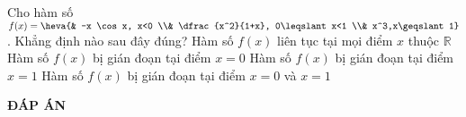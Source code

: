 \begin{ex}%
	Cho hàm số  $f(x)=\heva{& -x \cos x, x<0 \\& \dfrac{x^2}{1+x}, 0\leqslant x<1 \\& x^3,x\geqslant 1}$ . Khẳng định nào sau đây đúng?
	\choice
	{Hàm số  $f(x)$  liên tục tại mọi điểm  $x$  thuộc  $\mathbb{R}$}
	{Hàm số  $f(x)$  bị gián đoạn tại điểm  $x=0$}
	{\True Hàm số  $f(x)$  bị gián đoạn tại điểm  $x=1$}
	{Hàm số  $f(x)$  bị gián đoạn tại điểm  $x=0$  và  $x=1$}
\end{ex}

\newpage
\begin{center}
	\textbf{ĐÁP ÁN}
\end{center}
\begin{multicols}{10}
	 
\end{multicols}
